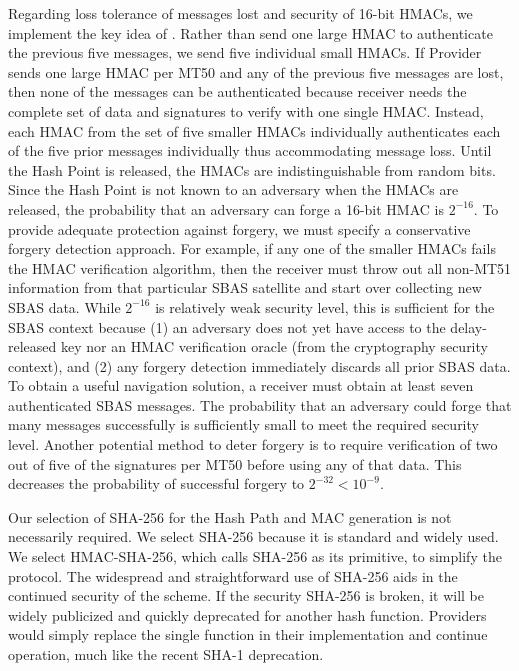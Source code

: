 \documentclass[letterpaper,times]{IONconf/IONconf}
\begin{document}
Regarding loss tolerance of messages lost and security of 16-bit HMACs, we implement the key idea of \cite{Neish_Dissertation}.
Rather than send one large HMAC to authenticate the previous five messages, we send five individual small HMACs.
If Provider sends one large HMAC per MT50 and any of the previous five messages are lost, then none of the messages can be authenticated because receiver needs the complete set of data and signatures to verify with one single HMAC.
Instead, each HMAC from the set of five smaller HMACs individually authenticates each of the five prior messages individually thus accommodating message loss.
Until the Hash Point is released, the HMACs are indistinguishable from random bits.
Since the Hash Point is not known to an adversary when the HMACs are released, the probability that an adversary can forge a 16-bit HMAC is $2^{-16}$.
To provide adequate protection against forgery, we must specify a conservative forgery detection approach.
For example, if any one of the smaller HMACs fails the HMAC verification algorithm, then the receiver must throw out all non-MT51 information from that particular SBAS satellite and start over collecting new SBAS data.
While $2^{-16}$ is relatively weak security level, this is sufficient for the SBAS context because (1) an adversary does not yet have access to the delay-released key nor an HMAC verification oracle (from the cryptography security context), and (2) any forgery detection immediately discards all prior SBAS data.
To obtain a useful navigation solution, a receiver must obtain at least seven authenticated SBAS messages.
The probability that an adversary could forge that many messages successfully is sufficiently small to meet the required security level.
Another potential method to deter forgery is to require verification of two out of five of the signatures per MT50 before using any of that data.
This decreases the probability of successful forgery to $2^{-32} < 10^{-9}$.

Our selection of SHA-256 for the Hash Path and MAC generation is not necessarily required.
We select SHA-256 because it is standard and widely used.
We select HMAC-SHA-256, which calls SHA-256 as its primitive, to simplify the protocol.
The widespread and straightforward use of SHA-256 aids in the continued security of the scheme.
If the security SHA-256 is broken, it will be widely publicized and quickly deprecated for another hash function.
Providers would simply replace the single function in their implementation and continue operation, much like the recent SHA-1 deprecation.
\end{document}
